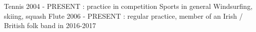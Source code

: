 

\begin{cvskills}

  \cvskill
    {Tennis} %
    {2004 - PRESENT : practice in competition} 
  \cvskill
    {Sports in general} %
    {Windsurfing, skiing, squash} 
  \cvskill
    {Flute} %
    {2006 - PRESENT : regular practice, member of an Irish / British folk band in 2016-2017} 
\end{cvskills}
